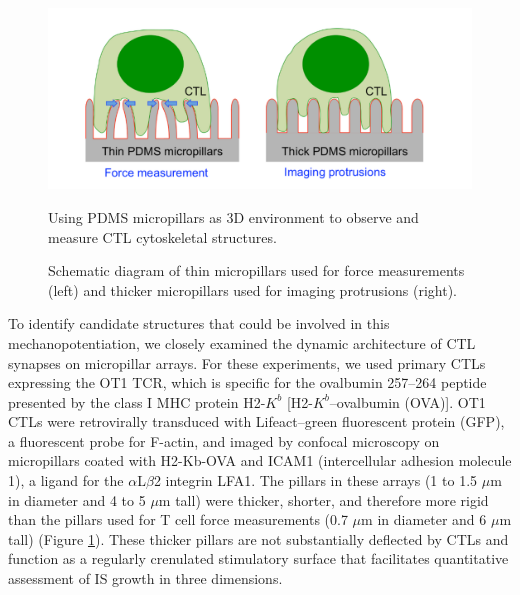 \begin{figure}[htbp]
	\centering
	\includegraphics[width=\textwidth]{../figures/chapter2/fig1pillarscartoon.png}
	\caption{Using PDMS micropillars as 3D environment to observe and measure CTL cytoskeletal structures.}
	\caption*{Schematic diagram of thin micropillars used for force measurements (left) and thicker micropillars used for imaging protrusions (right).}
	\label{fig:fig1pillarscartoon}
\end{figure}

To identify candidate structures that could be involved in this mechanopotentiation, we closely examined the dynamic architecture of CTL synapses on micropillar arrays. For these experiments, we used primary CTLs expressing the OT1 TCR, which is specific for the ovalbumin 257–264 peptide presented by the class I MHC protein H2-$K^{b}$ [H2-$K^{b}$–ovalbumin (OVA)]. OT1 CTLs were retrovirally transduced with Lifeact–green fluorescent protein (GFP), a fluorescent probe for F-actin, and imaged by confocal microscopy on micropillars coated with H2-Kb-OVA and ICAM1 (intercellular adhesion molecule 1), a ligand for the $\alpha$L$\beta$2 integrin LFA1. The pillars in these arrays (1 to 1.5 $\mu$m in diameter and 4 to 5 $\mu$m tall) were thicker, shorter, and therefore more rigid than the pillars used for T cell force measurements (0.7 $\mu$m in diameter and 6 $\mu$m tall) (Figure \ref{fig:fig1pillarscartoon}). These thicker pillars are not substantially deflected by CTLs and function as a regularly crenulated stimulatory surface that facilitates quantitative assessment of IS growth in three dimensions.

